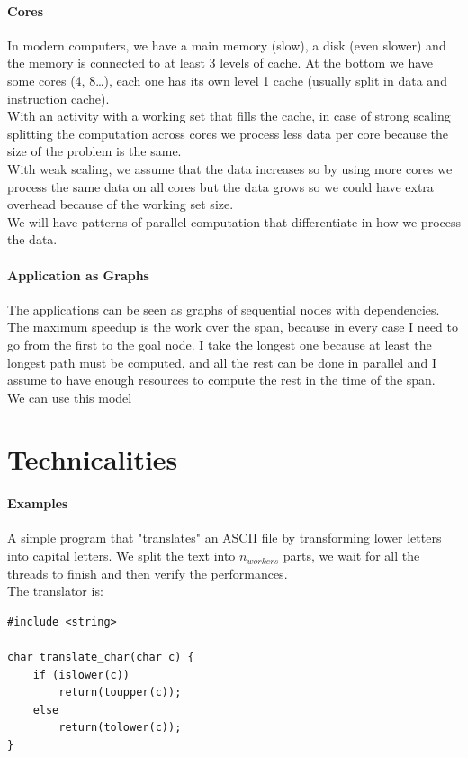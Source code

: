 \documentclass[10pt]{report}
\begin{document}
\paragraph{Cores} In modern computers, we have a main memory (slow), a disk (even slower) and the memory is connected to at least 3 levels of cache. At the bottom we have some cores (4, 8\ldots), each one has its own level 1 cache (usually split in data and instruction cache).\\
With an activity with a working set that fills the cache, in case of strong scaling splitting the computation across cores we process less data per core because the size of the problem is the same.\\
With weak scaling, we assume that the data increases so by using more cores we process the same data on all cores but the data grows so we could have extra overhead because of the working set size.\\
We will have patterns of parallel computation that differentiate in how we process the data.
\paragraph{Application as Graphs} The applications can be seen as graphs of sequential nodes with dependencies.
The maximum speedup is the work over the span, because in every case I need to go from the first to the goal node. I take the longest one because at least the longest path must be computed, and all the rest can be done in parallel and I assume to have enough resources to compute the rest in the time of the span.\\
We can use this model %
\section{Technicalities}
\paragraph{Examples}
A simple program that "translates" an ASCII file by transforming lower letters into capital letters. We split the text into $n_{workers}$ parts, we wait for all the threads to finish and then verify the performances.
\\The translator is:
\begin{lstlisting}[style=myC]
#include <string>

char translate_char(char c) {
	if (islower(c))
		return(toupper(c));
	else
		return(tolower(c));
}
\end{lstlisting}
\end{document}
